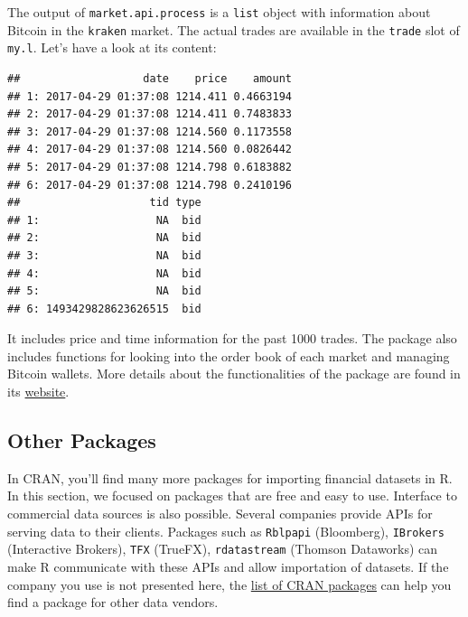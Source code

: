\documentclass[11pt,]{book}
\newenvironment{Shaded}{\begin{snugshade}}{\end{snugshade}}
\newcommand{\KeywordTok}[1]{\textcolor[rgb]{0.27,0.27,0.27}{\textbf{#1}}}
\newcommand{\OperatorTok}[1]{\textcolor[rgb]{0.81,0.36,0.00}{\textbf{#1}}}
\newcommand{\NormalTok}[1]{#1}
\begin{document}
The output of \texttt{market.api.process} is a \texttt{list} object with
information about Bitcoin in the
\texttt{\textquotesingle{}kraken\textquotesingle{}} market. The actual
trades are available in the \texttt{trade} slot of \texttt{my.l}. Let's
have a look at its content:

\begin{Shaded}
\end{Shaded}

\begin{verbatim}
##                   date    price    amount
## 1: 2017-04-29 01:37:08 1214.411 0.4663194
## 2: 2017-04-29 01:37:08 1214.411 0.7483833
## 3: 2017-04-29 01:37:08 1214.560 0.1173558
## 4: 2017-04-29 01:37:08 1214.560 0.0826442
## 5: 2017-04-29 01:37:08 1214.798 0.6183882
## 6: 2017-04-29 01:37:08 1214.798 0.2410196
##                    tid type
## 1:                  NA  bid
## 2:                  NA  bid
## 3:                  NA  bid
## 4:                  NA  bid
## 5:                  NA  bid
## 6: 1493429828623626515  bid
\end{verbatim}

It includes price and time information for the past 1000 trades. The
package also includes functions for looking into the order book of each
market and managing Bitcoin wallets. More details about the
functionalities of the package are found in its
\href{https://github.com/jangorecki/Rbitcoin}{website}.

\subsection{Other Packages}\label{other-packages}

In CRAN, you'll find many more packages for importing financial datasets
in R. In this section, we focused on packages that are free and easy to
use. Interface to commercial data sources is also possible. Several
companies provide APIs for serving data to their clients. Packages such
as \texttt{Rblpapi} (Bloomberg), \texttt{IBrokers} (Interactive
Brokers), \texttt{TFX} (TrueFX), \texttt{rdatastream} (Thomson
Dataworks) can make R communicate with these APIs and allow importation
of datasets. If the company you use is not presented here, the
\href{https://cran.r-project.org/}{list of CRAN packages} can help you
find a package for other data vendors.
\end{document}
